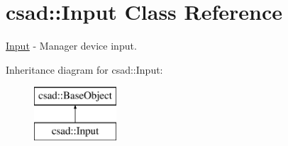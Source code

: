 \hypertarget{classcsad_1_1_input}{\section{csad\-:\-:Input Class Reference}
\label{classcsad_1_1_input}
}


\hyperlink{classcsad_1_1_input}{Input} -\/ Manager device input.  


Inheritance diagram for csad\-:\-:Input\-:\begin{figure}[H]
\begin{center}
\leavevmode
\includegraphics[height=2.000000cm]{classcsad_1_1_input}
\end{center}
\end{figure}
